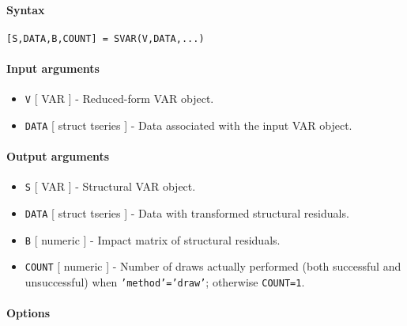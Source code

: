 


	\paragraph{Syntax}\label{syntax}

\begin{verbatim}
[S,DATA,B,COUNT] = SVAR(V,DATA,...)
\end{verbatim}

\paragraph{Input arguments}\label{input-arguments}

\begin{itemize}
\item
  \texttt{V} {[} VAR {]} - Reduced-form VAR object.
\item
  \texttt{DATA} {[} struct \textbar{} tseries {]} - Data associated with
  the input VAR object.
\end{itemize}

\paragraph{Output arguments}\label{output-arguments}

\begin{itemize}
\item
  \texttt{S} {[} VAR {]} - Structural VAR object.
\item
  \texttt{DATA} {[} struct \textbar{} tseries {]} - Data with
  transformed structural residuals.
\item
  \texttt{B} {[} numeric {]} - Impact matrix of structural residuals.
\item
  \texttt{COUNT} {[} numeric {]} - Number of draws actually performed
  (both successful and unsuccessful) when \texttt{'method'='draw'};
  otherwise \texttt{COUNT=1}.
\end{itemize}

\paragraph{Options}\label{options}

